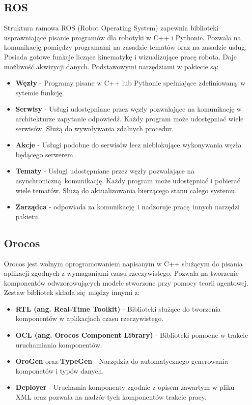 	\subsection{ROS}
	Struktura ramowa ROS (Robot Operating System)\cite{bib:ROS} zapewnia biblioteki usprawniające pisanie programów dla robotyki w C++ i Pythonie. Pozwala na komunikację pomiędzy programami na zasadzie tematów oraz na zasadzie usług. Posiada gotowe funkcje liczące kinematykę i wizualizujące pracę robota. Daje możliwość akwizycji danych. Podstawowymi narzędziami w pakiecie są:
	\begin{itemize}
		\item \textbf{Węzły} - Programy pisane w C++ lub Pythonie spełniające zdefiniowaną w sytemie funkcję.
		\item \textbf{Serwisy} - Usługi udostępniane przez węzły pozwalające na komunikację w architekturze zapytanie odpowiedź. Każdy program może udostępniać wiele serwisów. Służą do wywoływania zdalnych procedur.
		\item \textbf{Akcje} - Usługi podobne do serwisów lecz nieblokujące wykonywania węzła będącego serwerem.
		\item \textbf{Tematy} - Usługi udostępniane przez węzły pozwalające na asynchroniczną komunikację. Każdy program może udostępniać i pobierać wiele tematów. Służą do aktualizowania bierzącego stanu całego systemu.
		\item \textbf{Zarządca} - odpowiada za komunikację i nadzoruje pracę innych narzędzi pakietu.
	\end{itemize}
	\subsection{Orocos}
	Orocos jest wolnym oprogramowaniem napisanym w C++ służącym do pisania aplikacji zgodnych z wymaganiami czasu rzeczywistego. Pozwala na tworzenie komponentów odwzorowujących modele stworzone przy pomocy teorii agentowej. Zestaw bibliotek składa się między innymi z:
	\begin{itemize}
		\item \textbf{RTL (ang. Real-Time Toolkit)} - Biblioteki służące do  tworzenia komponentów w aplikacjach czasu rzeczywistego.
		\item \textbf{OCL (ang. Orocos Component Library)} - Biblioteki pomocne w trakcie uruchamiania komponentów.
		\item \textbf{OroGen} oraz \textbf{TypeGen} - Narzędzia do automatycznego generowania komponetów i typów danych.
		\item \textbf{Deployer} - Uruchamia komponenty zgodnie z opisem zawartym w pliku XML oraz pozwala na nadzór tych komponentów trakcie pracy.
	\end{itemize}

